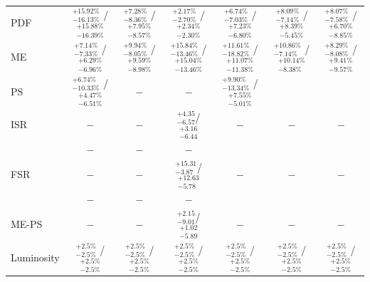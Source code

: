 \begin{table}[!htbp]
\begin{center}
{\begin{tabular}{lcccccc}
PDF             &  $_{-16.13\%}^{+15.92\%}$ /  $_{-16.39\%}^{+15.88\%}$   & $_{-8.36\%}^{+7.28\%}$ / $_{-8.57\%}^{+7.95\%}$  & $_{-2.70\%}^{+2.17\%}$ / $_{-2.30\%}^{+2.34\%}$  & $_{-7.03\%}^{+6.74\%}$ / $_{-6.80\%}^{+7.23\%}$  & $_{-7.14\%}^{+8.09\%}$ / $_{-5.45\%}^{+8.39\%}$ & $_{-7.58\%}^{+8.07\%}$ / $_{-8.85\%}^{+6.70\%}$\\
ME             &  $_{-7.33\%}^{+7.14\%}$ /  $_{-6.96\%}^{+6.29\%}$   & $_{-8.05\%}^{+9.94\%}$ / $_{-8.98\%}^{+9.59\%}$  & $_{-13.46\%}^{+15.84\%}$ / $_{-13.46\%}^{+15.04\%}$  & $_{-18.82\%}^{+11.61\%}$ / $_{-11.38\%}^{+11.07\%}$  & $_{-7.14\%}^{+10.86\%}$ / $_{-8.38\%}^{+10.14\%}$ & $_{-8.08\%}^{+8.29\%}$ / $_{-9.57\%}^{+9.41\%}$\\
PS             &  $_{-10.33\%}^{+6.74\%}$ /  $_{-6.51\%}^{+4.47\%}$   & $-$  & $-$ & $_{-13.34\%}^{+9.90\%}$ / $_{-5.01\%}^{+7.55\%}$  \\
ISR             &  $-$   & $-$  & $^{+4.35}_{-6.57}$/$_{-6.44}^{+3.16}$ & $-$  & $-$ & $-$  \\ & $-$  & $-$ & $-$  \\
FSR             &  $-$   & $-$  & $^{+15.31}_{-3.87}$/$_{-5.78}^{+12.63}$ & $-$  & $-$ & $-$  \\ & $-$  & $-$ & $-$  \\
ME-PS             &  $-$   & $-$  & $^{+2.15}_{-9.01}$/$_{-5.89}^{+1.02}$ & $-$  & $-$ & $-$ \\
Luminosity             &  $_{-2.5\%}^{+2.5\%}$ /  $_{-2.5\%}^{+2.5\%}$    & $_{-2.5\%}^{+2.5\%}$  / $_{-2.5\%}^{+2.5\%}$   & $_{-2.5\%}^{+2.5\%}$  / $_{-2.5\%}^{+2.5\%}$   & $_{-2.5\%}^{+2.5\%}$  / $_{-2.5\%}^{+2.5\%}$  & $_{-2.5\%}^{+2.5\%}$  / $_{-2.5\%}^{+2.5\%}$ & $_{-2.5\%}^{+2.5\%}$  / $_{-2.5\%}^{+2.5\%}$ \\    
\hline
\end{tabular}
}
\end{center}
\end{table}
